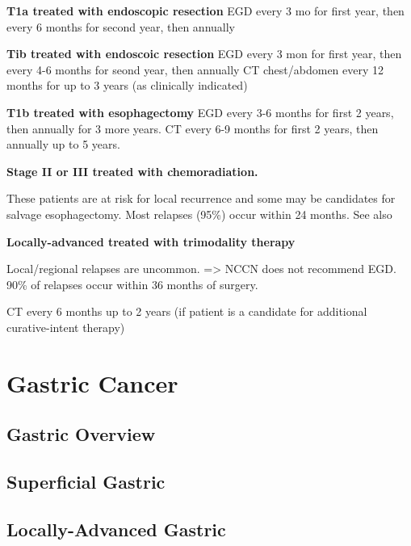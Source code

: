 \documentclass[
]{book}
\begin{document}
\textbf{T1a treated with endoscopic resection}
EGD every 3 mo for first year, then every 6 months for second year, then annually\citep{shaheen30}

\textbf{Tib treated with endoscoic resection}
EGD every 3 mon for first year, then every 4-6 months for seond year, then annually
CT chest/abdomen every 12 months for up to 3 years (as clinically indicated)

\textbf{T1b treated with esophagectomy}
EGD every 3-6 months for first 2 years, then annually for 3 more years.
CT every 6-9 months for first 2 years, then annually up to 5 years.

\textbf{Stage II or III treated with chemoradiation.}

These patients are at risk for local recurrence \citep{sudo3400} and some may be candidates for salvage esophagectomy. Most relapses (95\%) occur within 24 months. See also \citep{taketa1139}

\textbf{Locally-advanced treated with trimodality therapy}

Local/regional relapses are uncommon. \citep{dorth2099} \citep{oppedijk385} \citep{sudo4306} =\textgreater{} NCCN does not recommend EGD. 90\% of relapses occur within 36 months of surgery.

CT every 6 months up to 2 years (if patient is a candidate for additional curative-intent therapy)

\hypertarget{part-gastric-cancer}{%
\part*{Gastric Cancer}\label{part-gastric-cancer}}

\hypertarget{gastric-overview}{%
\chapter{Gastric Overview}\label{gastric-overview}}

\hypertarget{gast_superficial}{%
\chapter{Superficial Gastric}\label{gast_superficial}}

\hypertarget{locally-advanced-gastric}{%
\chapter{Locally-Advanced Gastric}\label{locally-advanced-gastric}}
\end{document}
